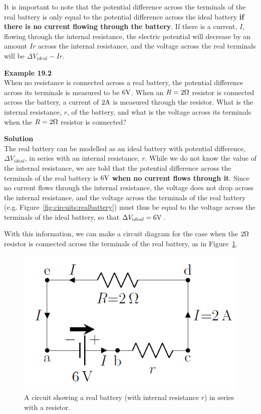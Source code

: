It is important to note that the potential difference across the terminals of the real battery is only equal to the potential difference across the ideal battery \textbf{if there is no current flowing through the battery}. If there is a current, $I$, flowing through the internal resistance, the electric potential will decrease by an amount $Ir$ across the internal resistance, and the voltage across the real terminals will be $\Delta V_{ideal} -Ir$.

\begin{framed}
\textbf{Example 19.2}\\
When no resistance is connected across a real battery, the potential difference across its terminals is measured to be $6 {\rm V}$. When an $R=2 {\rm \Omega}$ resistor is connected across the battery, a current of $2 {\rm A}$ is measured through the resistor. What is the internal resistance, $r$, of the battery, and what is the voltage across its terminals when the $R=2 {\rm \Omega}$ resistor is connected?

\begin{framed}
\textbf{Solution}\\
The real battery can be modelled as an ideal battery with potential difference, $\Delta V_{ideal}$, in series with an internal resistance, $r$. While we do not know the value of the internal resistance, we are told that the potential difference across the terminals of the real battery is $6 {\rm V}$ \textbf{when no current flows through it}. Since no current flows through the internal resistance, the voltage does not drop across the internal resistance, and the voltage across the terminals of the real battery (e.g. Figure~\ref{fig:circuits:realbattery}) must thus be equal to the voltage across the terminals of the ideal battery, so that $\Delta V_{ideal}=6 {\rm V}$.

With this information, we can make a circuit diagram for the case when the $2 {\rm \Omega}$ resistor is connected across the terminals of the real battery, as in Figure~\ref{fig:circuits:realbatterycircuit}.

\begin{figure}[!htbp]
\centering
\includegraphics[width=0.42\linewidth]{files/realbatterycircuit-c0da95c1617d5d17aee894d81382d86a.png}
\caption[]{A circuit showing a real battery (with internal resistance $r$) in series with a resistor.}
\label{fig:circuits:realbatterycircuit}
\end{figure}


\end{framed}
\end{framed}

